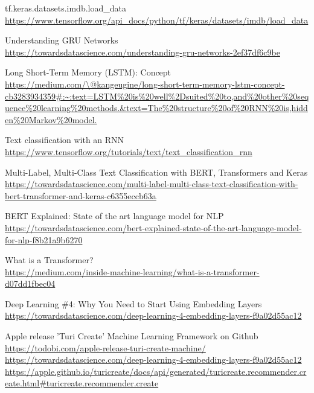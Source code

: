 \documentclass[12pt]{article}
\begin{document}
\begin{thebibliography}{12}
    
    tf.keras.datasets.imdb.load\_data
    \\\url{https://www.tensorflow.org/api\_docs/python/tf/keras/datasets/imdb/load\_data}

    Understanding GRU Networks
    \\\url{https://towardsdatascience.com/understanding-gru-networks-2ef37df6c9be}

    Long Short-Term Memory (LSTM): Concept
    \\\url{https://medium.com/\@kangeugine/long-short-term-memory-lstm-concept-cb3283934359\#:~:text=LSTM\%20is\%20well\%2Dsuited\%20to,and\%20other\%20sequence\%20learning\%20methods.\&text=The\%20structure\%20of\%20RNN\%20is,hidden\%20Markov\%20model.}
    
    Text classification with an RNN
    \\\url{https://www.tensorflow.org/tutorials/text/text\_classification\_rnn}

    Multi-Label, Multi-Class Text Classification with BERT, Transformers and Keras
    \\\url{https://towardsdatascience.com/multi-label-multi-class-text-classification-with-bert-transformer-and-keras-c6355eccb63a}

    BERT Explained: State of the art language model for NLP
    \\\url{https://towardsdatascience.com/bert-explained-state-of-the-art-language-model-for-nlp-f8b21a9b6270}

    What is a Transformer?
    \\\url{https://medium.com/inside-machine-learning/what-is-a-transformer-d07dd1fbec04}

    Deep Learning \#4: Why You Need to Start Using Embedding Layers
    \\\url{https://towardsdatascience.com/deep-learning-4-embedding-layers-f9a02d55ac12}

    Apple release 'Turi Create' Machine Learning Framework on Github
    \\\url{https://todobi.com/apple-release-turi-create-machine/}
    \\\url{https://towardsdatascience.com/deep-learning-4-embedding-layers-f9a02d55ac12}
    \\\url{https://apple.github.io/turicreate/docs/api/generated/turicreate.recommender.create.html#turicreate.recommender.create}

    \end{thebibliography}
\end{document}
